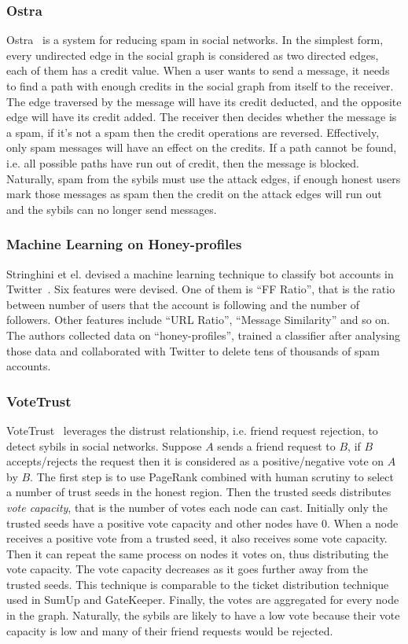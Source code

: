 \subsubsection{Ostra}
Ostra~\cite{mislove2008ostra} is a system for reducing spam in social networks.
In the simplest form, every undirected edge in the social graph is considered as
two directed edges, each of them has a credit value. When a user wants to send a
message, it needs to find a path with enough credits in the social graph from
itself to the receiver. The edge traversed by the message will have its credit
deducted, and the opposite edge will have its credit added. The receiver then
decides whether the message is a spam, if it's not a spam then the credit
operations are reversed. Effectively, only spam messages will have an effect on
the credits. If a path cannot be found, i.e. all possible paths have run out of
credit, then the message is blocked. Naturally, spam from the sybils must use
the attack edges, if enough honest users mark those messages as spam then the
credit on the attack edges will run out and the sybils can no longer send
messages.

\subsubsection{Machine Learning on Honey-profiles}
Stringhini et el. devised a machine learning technique to classify bot accounts
in Twitter~\cite{stringhini2010detecting}. Six features were devised. One of
them is ``FF Ratio'', that is the ratio between number of users that the account
is following and the number of followers. Other features include ``URL Ratio'',
``Message Similarity'' and so on. The authors collected data on
``honey-profiles'', trained a classifier after analysing those data and
collaborated with Twitter to delete tens of thousands of spam accounts.

\subsubsection{VoteTrust}
VoteTrust~\cite{xue2013votetrust} leverages the distrust relationship, i.e.
friend request rejection, to detect sybils in social networks. Suppose $A$ sends
a friend request to $B$, if $B$ accepts/rejects the request then it is
considered as a positive/negative vote on $A$ by $B$. The first step is to use
PageRank combined with human scrutiny to select a number of trust seeds in the
honest region. Then the trusted seeds distributes \emph{vote capacity}, that is
the number of votes each node can cast. Initially only the trusted seeds have a
positive vote capacity and other nodes have 0. When a node receives a positive
vote from a trusted seed, it also receives some vote capacity. Then it can
repeat the same process on nodes it votes on, thus distributing the vote
capacity. The vote capacity decreases as it goes further away from the trusted
seeds. This technique is comparable to the ticket distribution technique used in
SumUp and GateKeeper. Finally, the votes are aggregated for every node in the
graph. Naturally, the sybils are likely to have a low vote because their vote
capacity is low and many of their friend requests would be rejected.

